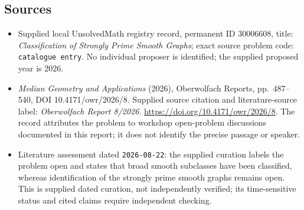 \documentclass[11pt]{article}
\begin{document}
\subsection{Sources}
\begin{itemize}
\item Supplied local UnsolvedMath registry record, permanent ID \(30006608\), title: \emph{Classification of Strongly Prime Smooth Graphs}; exact source problem code: \texttt{catalogue entry}. No individual proposer is identified; the supplied proposed year is 2026.
\item \emph{Median Geometry and Applications} (2026), Oberwolfach Reports, pp.\ 487--540, DOI 10.4171/owr/2026/8. Supplied source citation and literature-source label: \emph{Oberwolfach Report 8/2026}. \url{https://doi.org/10.4171/owr/2026/8}. The record attributes the problem to workshop open-problem discussions documented in this report; it does not identify the precise passage or speaker.
\item Literature assessment dated \texttt{2026-08-22}: the supplied curation labels the problem open and states that broad smooth subclasses have been classified, whereas identification of the strongly prime smooth graphs remains open. This is supplied dated curation, not independently verified; its time-sensitive status and cited claims require independent checking.
\end{itemize}
\end{document}
